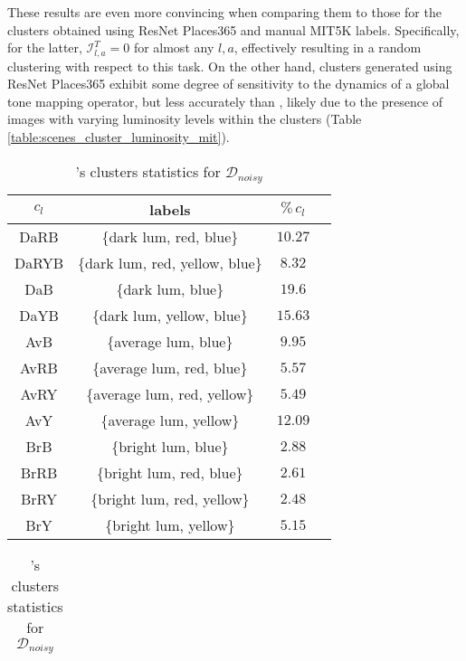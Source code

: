 \documentclass[12pt]{spieman}  %
\begin{document}
\begin{spacing}{2}
\begin{linenumbers}
These results are even more convincing when comparing them to those for the clusters obtained using ResNet Places365 and manual MIT5K labels.
Specifically, for the latter, $\mathcal{I}^T_{l,a}=0$ for almost any $l,a$,  effectively resulting in a random clustering with respect to this task.  On the other hand,  clusters generated using ResNet Places365 exhibit some degree of sensitivity to the dynamics of a global tone mapping operator, but less accurately than \clustname, likely due to the presence of images with varying luminosity levels within the clusters (Table \ref{table:scenes_cluster_luminosity_mit}). 


\begin{table}[ht]
    \centering
    \begin{minipage}{.5\textwidth}
        \centering
		\caption{\clustname's clusters statistics for $\mathcal{D}_{5K}$}
        \begin{tabular}{c||c|c|c}
			\hline
			$c_l$ & labels  & $\% \, c_l$\\
			\hline\hline
			DaRB & \{dark lum, red, blue\}  & $10.27$ \\
			\hline
			DaRYB & \{dark lum, red, yellow, blue\}  & $8.32$ \\
			\hline
			DaB & \{dark lum, blue\}  & $19.6$ \\
			\hline		
			DaYB & \{dark lum, yellow, blue\}  & $15.63$ \\
			\hline
			AvB & \{average lum, blue\}  & $9.95$ \\
			\hline
			AvRB & \{average lum, red, blue\}  & $5.57$ \\
			\hline
			AvRY & \{average lum, red, yellow\}  & $5.49$ \\
			\hline
			AvY & \{average lum, yellow\}  & $12.09$ \\
			\hline
			BrB & \{bright lum, blue\}  & $2.88$ \\
			\hline
			BrRB & \{bright lum, red, blue\}  & $2.61$ \\
			\hline
			BrRY & \{bright lum, red, yellow\}  & $2.48$ \\
			\hline
			BrY & \{bright lum, yellow\}  & $5.15$ \\
			\hline
		\end{tabular}
		\label{clusters_tm}
    \end{minipage}%
    \begin{minipage}{.5\textwidth}
        \centering
		\caption{\clustname's clusters statistics for $\mathcal{D}_{noisy}$}
        \begin{tabular}{c||c|c|c}

\end{tabular}
\end{minipage}
\end{table}
\end{linenumbers}
\end{spacing}
\end{document}
